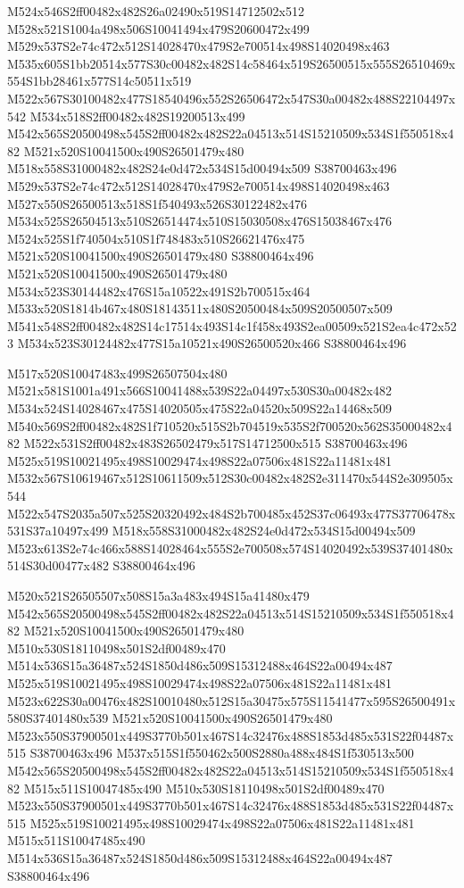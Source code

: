\documentclass{article}
\begin{document}
\begin{multicols}{2}
M524x546S2ff00482x482S26a02490x519S14712502x512 M528x521S1004a498x506S10041494x479S20600472x499 M529x537S2e74c472x512S14028470x479S2e700514x498S14020498x463 M535x605S1bb20514x577S30c00482x482S14c58464x519S26500515x555S26510469x554S1bb28461x577S14c50511x519 M522x567S30100482x477S18540496x552S26506472x547S30a00482x488S22104497x542 M534x518S2ff00482x482S19200513x499 M542x565S20500498x545S2ff00482x482S22a04513x514S15210509x534S1f550518x482 M521x520S10041500x490S26501479x480 M518x558S31000482x482S24e0d472x534S15d00494x509 S38700463x496 M529x537S2e74c472x512S14028470x479S2e700514x498S14020498x463 M527x550S26500513x518S1f540493x526S30122482x476 M534x525S26504513x510S26514474x510S15030508x476S15038467x476 M524x525S1f740504x510S1f748483x510S26621476x475 M521x520S10041500x490S26501479x480 S38800464x496 M521x520S10041500x490S26501479x480 M534x523S30144482x476S15a10522x491S2b700515x464 M533x520S1814b467x480S18143511x480S20500484x509S20500507x509 M541x548S2ff00482x482S14c17514x493S14c1f458x493S2ea00509x521S2ea4c472x523 M534x523S30124482x477S15a10521x490S26500520x466 S38800464x496

M517x520S10047483x499S26507504x480 M521x581S1001a491x566S10041488x539S22a04497x530S30a00482x482 M534x524S14028467x475S14020505x475S22a04520x509S22a14468x509 M540x569S2ff00482x482S1f710520x515S2b704519x535S2f700520x562S35000482x482 M522x531S2ff00482x483S26502479x517S14712500x515 S38700463x496 M525x519S10021495x498S10029474x498S22a07506x481S22a11481x481 M532x567S10619467x512S10611509x512S30c00482x482S2e311470x544S2e309505x544 M522x547S2035a507x525S20320492x484S2b700485x452S37c06493x477S37706478x531S37a10497x499 M518x558S31000482x482S24e0d472x534S15d00494x509 M523x613S2e74c466x588S14028464x555S2e700508x574S14020492x539S37401480x514S30d00477x482 S38800464x496

M520x521S26505507x508S15a3a483x494S15a41480x479 M542x565S20500498x545S2ff00482x482S22a04513x514S15210509x534S1f550518x482 M521x520S10041500x490S26501479x480 M510x530S18110498x501S2df00489x470 M514x536S15a36487x524S1850d486x509S15312488x464S22a00494x487 M525x519S10021495x498S10029474x498S22a07506x481S22a11481x481 M523x622S30a00476x482S10010480x512S15a30475x575S11541477x595S26500491x580S37401480x539 M521x520S10041500x490S26501479x480 M523x550S37900501x449S3770b501x467S14c32476x488S1853d485x531S22f04487x515 S38700463x496 M537x515S1f550462x500S2880a488x484S1f530513x500 M542x565S20500498x545S2ff00482x482S22a04513x514S15210509x534S1f550518x482 M515x511S10047485x490 M510x530S18110498x501S2df00489x470 M523x550S37900501x449S3770b501x467S14c32476x488S1853d485x531S22f04487x515 M525x519S10021495x498S10029474x498S22a07506x481S22a11481x481 M515x511S10047485x490 M514x536S15a36487x524S1850d486x509S15312488x464S22a00494x487 S38800464x496


\end{multicols}
\end{document}
